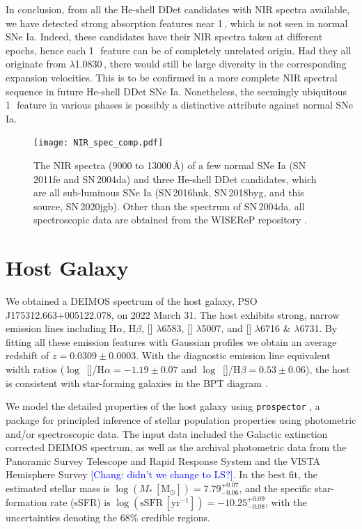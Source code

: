 \documentclass[twocolumn]{aastex631}
\newcommand{\sn}{SN\,2020jgb}
\newcommand{\chang}[1]{\textcolor{blue}{[Chang: #1]}}
\begin{document}
In conclusion, from all the He-shell DDet candidates with NIR spectra available, we have detected strong absorption features near 1\,\micron, which is not seen in normal SNe Ia. Indeed, these candidates have their NIR spectra taken at different epochs, hence each 1\,\micron\ feature can be of completely unrelated origin. Had they all originate from  $\lambda$1.0830\,\micron, there would still be large diversity in the corresponding expansion velocities. This is to be confirmed in a more complete NIR spectral sequence in future He-shell DDet SNe Ia. Nonetheless, the seemingly ubiquitous 1\,\micron\ feature in various phases is possibly a distinctive attribute against normal SNe Ia.

\begin{figure}
    \centering
    \texttt{[image: NIR\_spec\_comp.pdf]}
    \caption{The NIR spectra (9000 to 13000\,\r{A}) of a few normal SNe Ia (SN\,2011fe and SN\,2004da) and three He-shell DDet candidates, which are all sub-luminous SNe Ia (SN\,2016hnk, SN\,2018byg, and this source, \sn). Other than the spectrum of SN\,2004da, all spectroscopic data are obtained from the WISEReP repository \citep{wiserep_2012}.}
    \label{fig:NIR_comp}
\end{figure}

\section{Host Galaxy} \label{sec:host}
We obtained a DEIMOS spectrum of the host galaxy, PSO J175312.663+005122.078, on 2022 March 31. The host exhibits strong, narrow emission lines including H$\alpha$, H$\beta$, [] $\lambda$6583, [] $\lambda$5007, and [] $\lambda$6716 \& $\lambda$6731. By fitting all these emission features with Gaussian profiles we obtain an average redshift of $z=0.0309\pm0.0003$. With the diagnostic emission line equivalent width ratios ($\log$~[]/H$\alpha=-1.19\pm0.07$ and $\log$~[]/H$\beta=0.53\pm0.06$), the host is consistent with star-forming galaxies in the BPT diagram \citep{BPT_1981, Veilleux_1987}. 

We model the detailed properties of the host galaxy using \texttt{prospector} \citep{Johnson_prospector_2021}, a package for principled inference of stellar population properties using photometric and/or spectroscopic data. The input data included the Galactic extinction corrected DEIMOS spectrum, as well as the archival photometric data from the Panoramic Survey Telescope and Rapid Response System \citep[Pan-STARRS;][{\it r, i, z} Kron magnitudes]{PS1_2016}  and the VISTA Hemisphere Survey \citep[VHS;][J and $\mathrm{K}_\mathrm{s}$ Petrosian magnitudes]{VHS_2013} \chang{didn't we change to LS?}. In the best fit, the estimated stellar mass is $\log (M_*\,[\mathrm{M_\odot}])=7.79_{-0.06}^{+0.07}$, and the specific star-formation rate (sSFR) is $\log (\mathrm{sSFR}\,[\mathrm{yr}^{-1}])=-10.25_{-0.08}^{+0.09}$, with the uncertainties denoting the 68\% credible regions.
\end{document}
